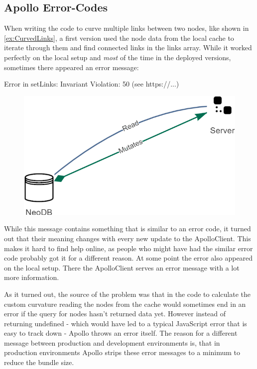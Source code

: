 \subsection{Apollo Error-Codes}
When writing the code to curve multiple links between two nodes, like shown in \autoref{ex:CurvedLinks}, a first version used the node data from the local cache to iterate through them and find connected links in the links array. While it worked perfectly on the local setup and \emph{most} of the time in the deployed versions, sometimes there appeared an error message:

\centerline{Error in setLinks: Invariant Violation: 50 (see https://...)} 

\begin{figure}[h]
\centering
\includegraphics[scale=.5]{Bilder/CurvedLinks.png}
\label{ex:CurvedLinks}
\end{figure}

While this message contains something that is similar to an error code, it turned out that their meaning changes with every new update to the ApolloClient. This makes it hard to find help online, as people who might have had the similar error code probably got it for a different reason. At some point the error also appeared on the local setup. There the ApolloClient serves an error message with a lot more information. 

As it turned out, the source of the problem was that in the code to calculate the custom curvature reading the nodes from the cache would sometimes end in an error if the query for nodes hasn't returned data yet. However instead of returning undefined - which would have led to a typical JavaScript error that is easy to track down - Apollo throws an error itself. The reason for a different message between production and development environments is, that in production environments Apollo strips these error messages to a minimum to reduce the bundle size.

